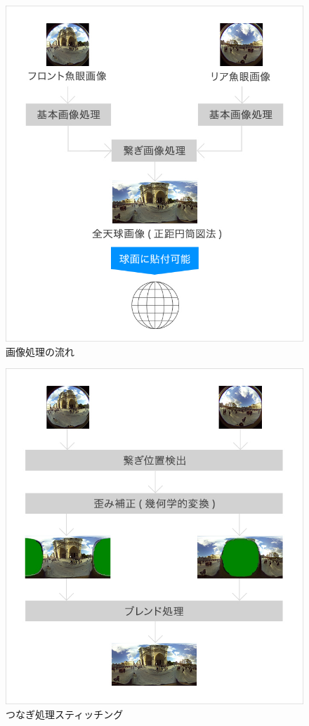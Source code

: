 \begin{figure}[tbp]
  \centering
  \includegraphics[scale=0.6]{fig/thetaref1.jpg}
  \caption{画像処理の流れ\cite{4}}\label{theta1}
\end{figure}

\begin{figure}[tbp]
  \centering
  \includegraphics[scale=0.6]{fig/thetaref2.jpg}
  \caption{つなぎ処理スティッチング\cite{4}}\label{theta2}
\end{figure}

